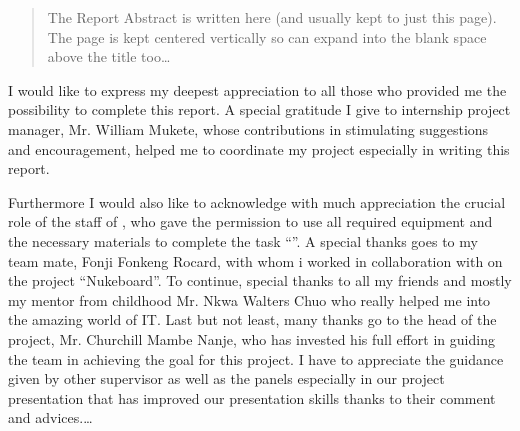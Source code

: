 \documentclass[
11pt, %
english, %
singlespacing, %
headsepline, %
]{InternshipReport} %
\begin{document}
\hfill \authorname


\begin{abstract}
\addchaptertocentry{\abstractname} %

The Report Abstract is written here (and usually kept to just this page). The page is kept centered vertically so can expand into the blank space above the title too\ldots

\end{abstract}


\begin{acknowledgements}
\addchaptertocentry{\acknowledgementname} %

I would like to express my deepest appreciation to all those who provided me the possibility to complete this report. A special gratitude I give to internship project manager, Mr. William Mukete, whose contributions in stimulating suggestions and encouragement, helped me to coordinate my project especially in writing this report.

Furthermore I would also like to acknowledge with much appreciation the crucial role of the staff of {\facname}, who gave the permission to use all required equipment and the necessary materials to complete the  task \enquote{\ttitle}. A special thanks goes to my team mate, Fonji Fonkeng Rocard, with whom i worked in collaboration with on the project “Nukeboard”. To continue, special thanks to all my friends and mostly my mentor from childhood Mr. Nkwa Walters Chuo who really helped me into the amazing world of IT. Last but not least, many thanks go to the head of the project, Mr. Churchill Mambe Nanje, who has invested his full effort in guiding the team in achieving the goal for this project. I have to appreciate the guidance given by other supervisor as well as the panels especially in our project presentation that has improved our presentation skills thanks to their comment and advices.\ldots

\end{acknowledgements}
\end{document}
